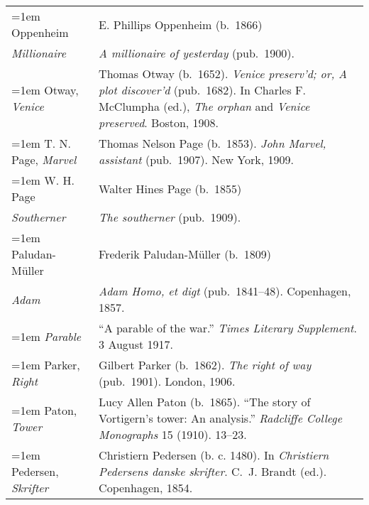 \begin{xltabular}{\textwidth}{ lQ }
\hangindent=1em  Oppenheim & E. Phillips Oppenheim (b.~1866)\\
\hspace{1em}\textit{Millionaire} &  \textit{A millionaire of yesterday} (pub.~1900). \\

\hangindent=1em  Otway, \textit{Venice} & Thomas Otway (b.~1652). \textit{Venice preserv’d; or, A plot discover’d} (pub.~1682). In Charles F. McClumpha (ed.), \textit{The orphan} and \textit{Venice preserved}. Boston, 1908. \\ %

\hangindent=1em  T. N. Page, \textit{Marvel} & Thomas Nelson Page (b.~1853). \textit{John Marvel, assistant} (pub.~1907). New York, 1909. \\

\hangindent=1em  W. H. Page & Walter Hines Page (b.~1855)\\
\hspace{1em}\textit{Southerner} & \textit{The southerner} (pub.~1909). \\

\hangindent=1em  Paludan-Müller & Frederik Paludan-Müller (b.~1809)\\
\hspace{1em}\textit{Adam} & \textit{Adam Homo, et digt} (pub.~1841--48). Copenhagen, 1857. \\

\hangindent=1em  \textit{Parable} & ``A parable of the war.'' \textit{Times Literary Supplement}. 3 August 1917. \\ %

\hangindent=1em  Parker, \textit{Right} & Gilbert Parker (b.~1862). \textit{The right of way} (pub.~1901). London, 1906. \\

\hangindent=1em  Paton, \textit{Tower} & Lucy Allen Paton (b.~1865). ``The story of Vortigern's tower: An analysis.'' \textit{Radcliffe College Monographs} 15 (1910). 13--23. \\

\hangindent=1em  Pedersen, \textit{Skrifter} & Christiern Pedersen (b. c. 1480). In \textit{Christiern Pedersens danske skrifter}. C.~J. Brandt (ed.). Copenhagen, 1854. \\ %


\end{xltabular}
